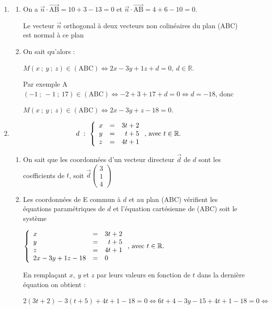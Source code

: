 \documentclass[10pt]{article}
\providecommand{\R}{\mathbb{R}}
\providecommand{\vect}[1]{\overrightarrow{#1}}
\begin{document}
\begin{enumerate}[resume]
	\item 
	\begin{enumerate}
		\item 
On a $\vect{n} \cdot \vect{\text{AB}} = 10  + 3 - 13 = 0$ et  $\vect{n} \cdot \vect{\text{AB}} = 4  + 6 - 10 = 0$.

Le vecteur $\vect{n}$ orthogonal à deux vecteurs non colinéaires du plan (ABC) est normal à ce plan
		\item 
On sait qu'alors :
		
$M(x~;~y~;~z) \in  (\text{ABC}) \iff 2x - 3y + 1z + d = 0, \: d \in \R$.
		
Par exemple A$(-1~;~-1~;~17)\in (\text{ABC}) \iff - 2 + 3 + 17 + d = 0 \iff d = -18$, donc 

$M(x~;~y~;~z) \in  (\text{ABC}) \iff 2x - 3y + z - 18 = 0$.
\end{enumerate}
	\item 

\[ d~:~\left\{\begin{array}{l c l}
x&=&3t+2\\y&=&\phantom{3}t+5\\z&=&4t+1\end{array}\right.\text{, avec } t \in \R. \]
	\begin{enumerate}
		\item 
On sait que les coordonnées d'un vecteur directeur $\vect{d}$ de $d$ sont les coefficients de $t$, soit $\vect{d}\begin{pmatrix}3\\1\\4\end{pmatrix}$
		\item 
		Les coordonnées de E commun à $d$ et au plan (ABC) vérifient les équations paramétriques de $d$ et l'équation cartésienne de (ABC) soit le système
		
		$\left\{\begin{array}{l c l}
x&=&3t+2\\y&=&\phantom{3}t+5\\z&=&4t+1\\
2x - 3y + 1z - 18 &=& 0
\end{array}\right.\text{, avec } t \in \R.$

En remplaçant $x, \:y$ et $z$ par leurs valeurs en fonction de $t$ dans la dernière équation on obtient :

$2(3t + 2)- 3(t + 5) + 4t + 1 - 18 = 0 \iff 6t + 4 - 3y - 15 + 4t + 1 - 18 = 0\iff $


\end{enumerate}
\end{enumerate}
\end{document}
